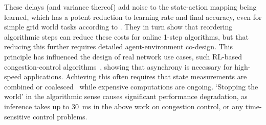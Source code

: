 These delays (and variance thereof) add noise to the state-action mapping being learned, which has a potent reduction to learning rate and final accuracy, even for simple grid world tasks according to \textcite{DBLP:journals/firai/TravnikMSP18}.
They in turn show that reordering algorithmic steps can reduce these costs for online 1-step algorithms, but that reducing this further requires detailed agent-environment co-design.
This principle has influenced the design of real network use cases, such RL-based congestion-control algorithms~\parencite{DBLP:journals/corr/abs-1910-04054}, showing that asynchrony is necessary for high-speed applications.
Achieving this often requires that state measurements are combined or coalesced~\parencite{DBLP:journals/corr/abs-1910-04054,DBLP:journals/tnsm/SimpsonRP20} while expensive computations are ongoing.
`Stopping the world' in the algorithmic sense causes significant performance degradation, as inference takes up to \SI{30}{\milli\second} in the above work on congestion control, or any time-sensitive control problems.

